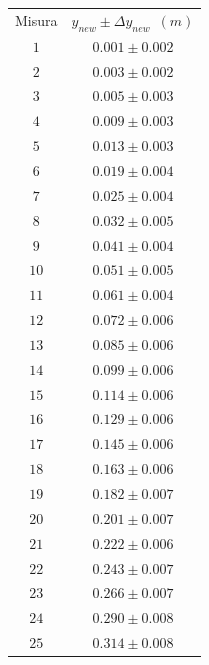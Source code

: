 \documentclass[12pt, a4paper]{article}
\begin{document}
\begin{longtable}{|c|c|}
    \hline
    \multirow{2}{*}{\small Misura} &
    \multirow{2}{*}{ \small$y_{new}\pm \Delta y_{new}$\ $(m)$} 
    \\&\\
\hline
\hline
    \footnotesize $1$ & \footnotesize$0.001\pm0.002$\\ 
    \footnotesize $2$ & \footnotesize$0.003\pm0.002 $\\ 
    \footnotesize $3$ & \footnotesize$0.005\pm0.003 $\\
    \footnotesize $4$ & \footnotesize$0.009\pm0.003 $\\
    \footnotesize $5$ & \footnotesize$0.013\pm0.003 $\\
    \footnotesize $6$ & \footnotesize$0.019\pm0.004$\\
    \footnotesize $7$ & \footnotesize$0.025\pm0.004$\\
    \footnotesize $8$ & \footnotesize$0.032\pm0.005$\\
    \footnotesize $9$ & \footnotesize$0.041\pm0.004$\\  
    \footnotesize $10$ & \footnotesize$0.051\pm0.005$\\
    \footnotesize $11$ & \footnotesize$0.061\pm0.004$\\
    \footnotesize $12$ &\footnotesize $0.072\pm0.006$\\
    \footnotesize $13$ & \footnotesize$0.085\pm0.006$\\
    \footnotesize $14$ & \footnotesize$0.099\pm0.006$\\
    \footnotesize $15$ & \footnotesize$0.114\pm0.006$\\
    \footnotesize $16$ & \footnotesize$0.129\pm0.006$\\
    \footnotesize $17$ & \footnotesize$0.145\pm0.006$\\
    \footnotesize $18$ & \footnotesize$0.163\pm0.006$\\
    \footnotesize $19$ & \footnotesize$0.182\pm0.007$\\
    \footnotesize $20$ & \footnotesize$0.201\pm0.007$\\
    \footnotesize $21$ & \footnotesize$0.222\pm0.006$\\
    \footnotesize $22$ & \footnotesize$0.243\pm0.007$\\ 
    \footnotesize $23$ & \footnotesize$0.266\pm0.007$\\
    \footnotesize $24$ & \footnotesize$0.290\pm0.008$\\
    \footnotesize $25$ & \footnotesize$0.314\pm0.008$\\

\end{longtable}
\end{document}
